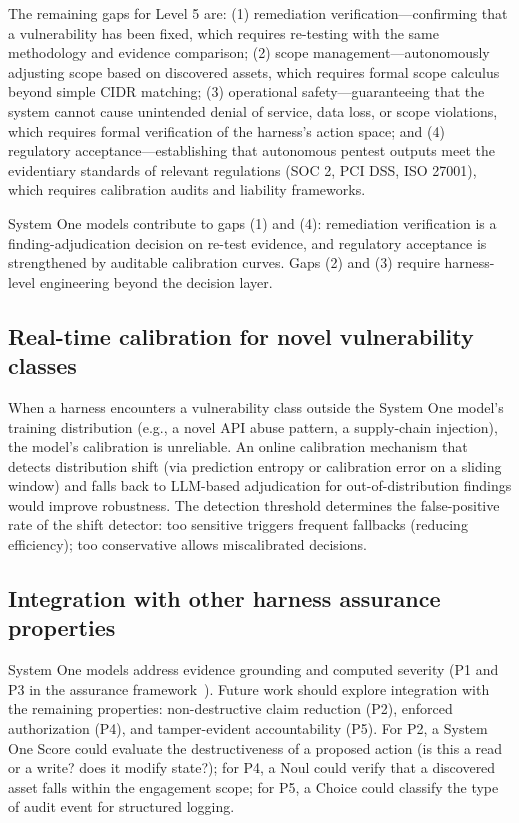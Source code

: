 \documentclass[conference]{IEEEtran}
\begin{document}
The remaining gaps for Level 5 are: (1) remediation verification---confirming that a vulnerability has been fixed, which requires re-testing with the same methodology and evidence comparison; (2) scope management---autonomously adjusting scope based on discovered assets, which requires formal scope calculus beyond simple CIDR matching; (3) operational safety---guaranteeing that the system cannot cause unintended denial of service, data loss, or scope violations, which requires formal verification of the harness's action space; and (4) regulatory acceptance---establishing that autonomous pentest outputs meet the evidentiary standards of relevant regulations (SOC 2, PCI DSS, ISO 27001), which requires calibration audits and liability frameworks.

System One models contribute to gaps (1) and (4): remediation verification is a finding-adjudication decision on re-test evidence, and regulatory acceptance is strengthened by auditable calibration curves. Gaps (2) and (3) require harness-level engineering beyond the decision layer.

\subsection{Real-time calibration for novel vulnerability classes}

When a harness encounters a vulnerability class outside the System One model's training distribution (e.g., a novel API abuse pattern, a supply-chain injection), the model's calibration is unreliable. An online calibration mechanism that detects distribution shift (via prediction entropy or calibration error on a sliding window) and falls back to LLM-based adjudication for out-of-distribution findings would improve robustness. The detection threshold determines the false-positive rate of the shift detector: too sensitive triggers frequent fallbacks (reducing efficiency); too conservative allows miscalibrated decisions.

\subsection{Integration with other harness assurance properties}

System One models address evidence grounding and computed severity (P1 and P3 in the assurance framework~\cite{santos2026assurance}). Future work should explore integration with the remaining properties: non-destructive claim reduction (P2), enforced authorization (P4), and tamper-evident accountability (P5). For P2, a System One Score could evaluate the destructiveness of a proposed action (is this a read or a write? does it modify state?); for P4, a Noul could verify that a discovered asset falls within the engagement scope; for P5, a Choice could classify the type of audit event for structured logging.
\end{document}
